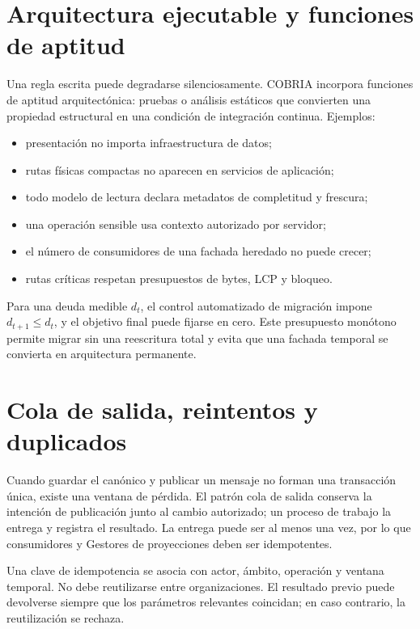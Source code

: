 \section{Arquitectura ejecutable y funciones de aptitud}

Una regla escrita puede degradarse silenciosamente. COBRIA incorpora funciones de
aptitud arquitectónica: pruebas o análisis estáticos que convierten una propiedad
estructural en una condición de integración continua. Ejemplos:

\begin{itemize}[leftmargin=*]
  \item presentación no importa infraestructura de datos;
  \item rutas físicas compactas no aparecen en servicios de aplicación;
  \item todo modelo de lectura declara metadatos de completitud y frescura;
  \item una operación sensible usa contexto autorizado por servidor;
  \item el número de consumidores de una fachada heredado no puede crecer;
  \item rutas críticas respetan presupuestos de bytes, LCP y bloqueo.
\end{itemize}

Para una deuda medible \(d_t\), el control automatizado de migración impone
\(d_{t+1}\leq d_t\), y el objetivo final puede fijarse en cero. Este presupuesto
monótono permite migrar sin una reescritura total y evita que una fachada temporal se
convierta en arquitectura permanente.

\section{Cola de salida, reintentos y duplicados}

Cuando guardar el canónico y publicar un mensaje no forman una transacción única, existe
una ventana de pérdida. El patrón cola de salida conserva la intención de publicación junto al
cambio autorizado; un proceso de trabajo la entrega y registra el resultado. La entrega puede ser
al menos una vez, por lo que consumidores y Gestores de proyecciones deben ser idempotentes.

Una clave de idempotencia se asocia con actor, ámbito, operación y ventana temporal. No
debe reutilizarse entre organizaciones. El resultado previo puede devolverse siempre que los
parámetros relevantes coincidan; en caso contrario, la reutilización se rechaza.

